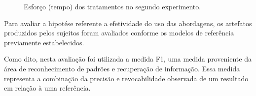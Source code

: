 
\begin{figure}[!htb]
        \centering
        \caption{Esforço (tempo) dos tratamentos no segundo experimento.}
        \label{fig:boxplotTempo2}
        
\end{figure}



Para avaliar a hipotése referente a efetividade do uso das abordagens, os artefatos produzidos pelos sujeitos foram avaliados conforme os modelos de referência previamente estabelecidos.

Como dito, nesta avaliação foi utilizada a medida F1, uma medida proveniente da área de reconhecimento de padrões e recuperação de informação. 
Essa medida representa a combinação da precisão e revocabilidade observada de um resultado em relação à uma referência.

